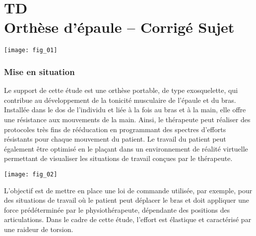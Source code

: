 \chapter*{TD  \\ 
Orthèse d'épaule -- \ifprof Corrigé \else Sujet \fi}

\iflivret {} \else
\ifprof  {} \else \fi
\fi

\setcounter{question}{0}
\begin{marginfigure}[4cm]
\centering
\texttt{[image: fig\_01]}
\end{marginfigure}


\subsection*{Mise en situation}

Le support de cette étude est une orthèse portable, de type exosquelette, qui contribue au développement de la tonicité musculaire de l’épaule et du bras. Installée dans le dos de l’individu
et liée à la fois au bras et à la main, elle offre une résistance aux mouvements de la main. Ainsi, le thérapeute
peut réaliser des protocoles très fins de rééducation en programmant des spectres d’efforts résistants pour chaque
mouvement du patient. Le travail du patient peut également être optimisé en le plaçant dans un environnement
de réalité virtuelle permettant de visualiser les situations de travail conçues par le thérapeute.

\begin{marginfigure}[5cm]
\texttt{[image: fig\_02]}
\end{marginfigure}
\begin{obj}
L’objectif est de mettre en place une loi de commande utilisée, par exemple, pour des
situations de travail où le patient peut déplacer le bras et doit appliquer une force prédéterminée par le
physiothérapeute, dépendante des positions des articulations. Dans le cadre de cette étude, l’effort est
élastique et caractérisé par une raideur de torsion. 
\end{obj}

